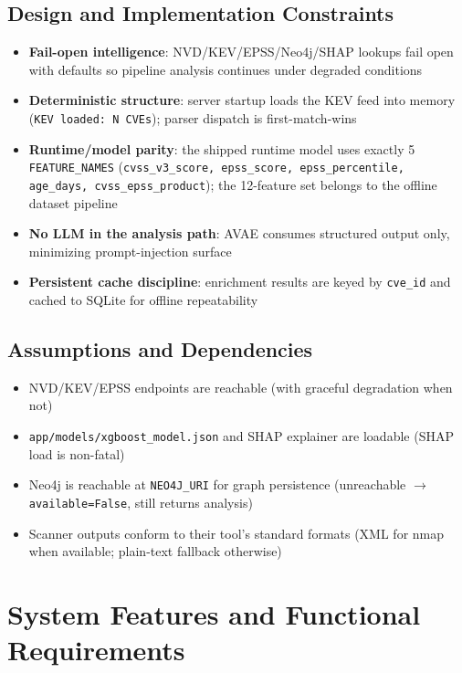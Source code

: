 \documentclass[10pt,journal,onecolumn]{IEEEtran}
\begin{document}
\subsection{Design and Implementation Constraints}

\begin{itemize}
\item \textbf{Fail-open intelligence}: NVD/KEV/EPSS/Neo4j/SHAP lookups fail open with defaults so pipeline analysis continues under degraded conditions
\item \textbf{Deterministic structure}: server startup loads the KEV feed into memory (\texttt{KEV loaded: N CVEs}); parser dispatch is first-match-wins
\item \textbf{Runtime/model parity}: the shipped runtime model uses exactly 5 \texttt{FEATURE\_NAMES} (\texttt{cvss\_\allowbreak v3\_\allowbreak score, epss\_\allowbreak score, epss\_\allowbreak percentile, age\_\allowbreak days, cvss\_\allowbreak epss\_\allowbreak product}); the 12-feature set belongs to the offline dataset pipeline
\item \textbf{No LLM in the analysis path}: AVAE consumes structured output only, minimizing prompt-injection surface
\item \textbf{Persistent cache discipline}: enrichment results are keyed by \texttt{cve\_id} and cached to SQLite for offline repeatability
\end{itemize}

\subsection{Assumptions and Dependencies}

\begin{itemize}
\item NVD/KEV/EPSS endpoints are reachable (with graceful degradation when not)
\item \texttt{app/\allowbreak models/\allowbreak xgboost\_\allowbreak model.\allowbreak json} and SHAP explainer are loadable (SHAP load is non-fatal)
\item Neo4j is reachable at \texttt{NEO4J\_URI} for graph persistence (unreachable $\rightarrow$ \texttt{available=False}, still returns analysis)
\item Scanner outputs conform to their tool's standard formats (XML for nmap when available; plain-text fallback otherwise)
\end{itemize}

\section{System Features and Functional Requirements}
\end{document}
